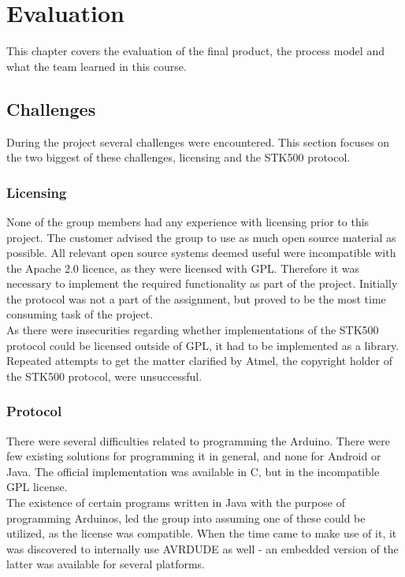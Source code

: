 \chapter{Evaluation}

This chapter covers the evaluation of the final product, the process model and what the team learned in this course.

\section{Challenges}
During the project several challenges were encountered. This section focuses on the two biggest of these challenges, licensing and the STK500 protocol.

	\subsection{Licensing}
	None of the group members had any experience with licensing prior to this project. The customer advised the group to use as much open source material as possible. All relevant open source systems deemed useful were incompatible with the Apache 2.0 licence, as they were licensed with GPL. Therefore it was necessary to implement the required functionality as part of the project. Initially the protocol was not a part of the assignment, but proved to be the most time consuming task of the project. \\

	As there were insecurities regarding whether implementations of the STK500 protocol could be licensed outside of GPL, it had to be implemented as a library. Repeated attempts to get the matter clarified by Atmel, the copyright holder of the STK500 protocol, were unsuccessful. \\

	\subsection{Protocol}\label{sec:protocol-issues}
	There were several difficulties related to programming the Arduino. There were few existing solutions for programming it in general, and none for Android or Java. The official implementation was available in C, but in the incompatible GPL license.\\

	The existence of certain programs written in Java with the purpose of programming Arduinos, led the group into assuming one of these could be utilized, as the license was compatible. When the time came to make use of it, it was discovered to internally use AVRDUDE as well - an embedded version of the latter was available for several platforms.\\

